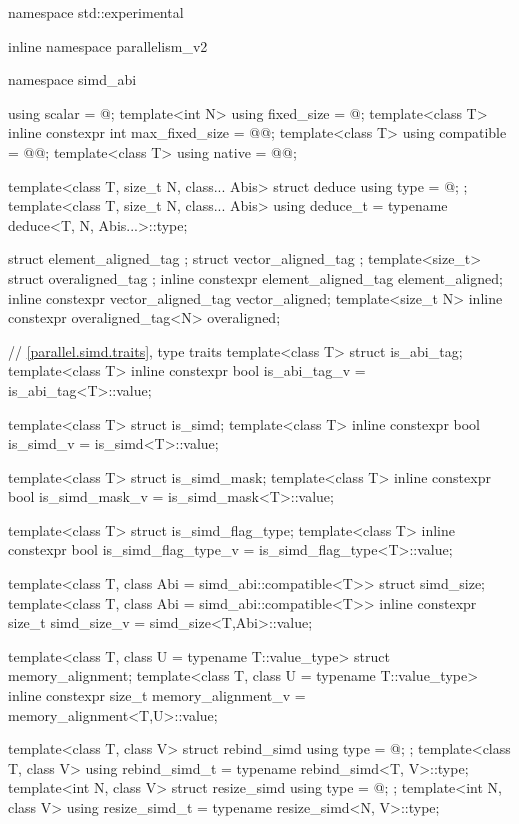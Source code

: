 \begin{codeblock}
namespace std::experimental {
inline namespace parallelism_v2 {
  namespace simd_abi {
    using scalar = @\seebelow@;
    template<int N> using fixed_size = @\seebelow@;
    template<class T> inline constexpr int max_fixed_size = @@;
    template<class T> using compatible = @@;
    template<class T> using native = @@;

    template<class T, size_t N, class... Abis> struct deduce { using type = @\seebelow@; };
    template<class T, size_t N, class... Abis> using deduce_t =
      typename deduce<T, N, Abis...>::type;
  }

  struct element_aligned_tag {};
  struct vector_aligned_tag {};
  template<size_t> struct overaligned_tag {};
  inline constexpr element_aligned_tag element_aligned{};
  inline constexpr vector_aligned_tag vector_aligned{};
  template<size_t N> inline constexpr overaligned_tag<N> overaligned{};

  // \ref{parallel.simd.traits},  type traits
  template<class T> struct is_abi_tag;
  template<class T> inline constexpr bool is_abi_tag_v = is_abi_tag<T>::value;

  template<class T> struct is_simd;
  template<class T> inline constexpr bool is_simd_v = is_simd<T>::value;

  template<class T> struct is_simd_mask;
  template<class T> inline constexpr bool is_simd_mask_v = is_simd_mask<T>::value;

  template<class T> struct is_simd_flag_type;
  template<class T> inline constexpr bool is_simd_flag_type_v =
    is_simd_flag_type<T>::value;

  template<class T, class Abi = simd_abi::compatible<T>> struct simd_size;
  template<class T, class Abi = simd_abi::compatible<T>>
    inline constexpr size_t simd_size_v = simd_size<T,Abi>::value;

  template<class T, class U = typename T::value_type> struct memory_alignment;
  template<class T, class U = typename T::value_type>
    inline constexpr size_t memory_alignment_v = memory_alignment<T,U>::value;

  template<class T, class V> struct rebind_simd { using type = @\seebelow@; };
  template<class T, class V> using rebind_simd_t = typename rebind_simd<T, V>::type;
  template<int N, class V> struct resize_simd { using type = @\seebelow@; };
  template<int N, class V> using resize_simd_t = typename resize_simd<N, V>::type;

}}
\end{codeblock}
